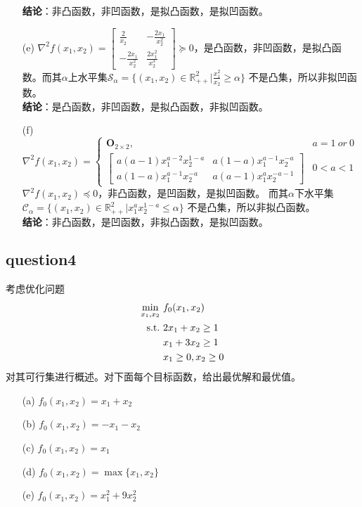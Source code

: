 \documentclass[12pt,a4paper]{ctexart}
\begin{document}
\begin{itemize}
    \textbf{结论}：非凸函数，非凹函数，是拟凸函数，是拟凹函数。
    \item[(e)] $\nabla^2f(x_1,x_2)=
    \begin{bmatrix}
        \frac{2}{x_2} & -\frac{2x_1}{x_2^2} \\
        -\frac{2x_1}{x_2^2} & \frac{2x_1^2}{x_2^3}
    \end{bmatrix} \succeq 0
    $，是凸函数，非凹函数，是拟凸函数。而其$\alpha$上水平集$\mathcal{S}_{\alpha}=\{(x_1,x_2) \in \mathbb{R}^2_{++} | \frac{x_1^2}{x_2}\geq \alpha\}$
    不是凸集，所以非拟凹函数。\\
    \textbf{结论}：是凸函数，非凹函数，是拟凸函数，非拟凹函数。
    \item[(f)]
    $
        \nabla^2f(x_1,x_2)=\left\{
        \begin{array}{ll}
        \boldsymbol{O}_{2 \times 2}, &a=1\ or\ 0\\
        \begin{bmatrix}
            a(a-1)x_1^{a-2}x_2^{1-a} & a(1-a)x_1^{a-1}x_2^{-a} \\
            a(1-a)x_1^{a-1}x_2^{-a} & a(a-1)x_1^{a}x_2^{-a-1}
        \end{bmatrix} & 0<a<1
        \end{array}
        \right.
    $
    $\nabla^2 f(x_1,x_2) \preceq 0$，非凸函数，是凹函数，是拟凹函数。
    而其$\alpha$下水平集$\mathcal{C}_{\alpha}=\{(x_1,x_2) \in \mathbb{R}^2_{++} | x_1^a x_2^{1-a}\leq \alpha\}$
    不是凸集，所以非拟凸函数。\\
    \textbf{结论}：非凸函数，是凹函数，非拟凸函数，是拟凹函数。

\end{itemize}  

\subsection*{question4}
考虑优化问题
\begin{align*}
\min_{x_1,x_2} \ &f_0(x_1,x_2) \\
\rm{s.t.}\  &2x_1+x_2 \geq 1\\
          & x_1+3x_2 \geq 1\\
          &x_1 \geq 0,x_2 \geq 0
\end{align*}
对其可行集进行概述。对下面每个目标函数，给出最优解和最优值。
\begin{itemize}
    \item[(a)] $f_0(x_1,x_2)=x_1+x_2$
    \item[(b)] $f_0(x_1,x_2)=-x_1-x_2$
    \item[(c)] $f_0(x_1,x_2)=x_1$
    \item[(d)] $f_0(x_1,x_2)=\max\{x_1,x_2\}$
    \item[(e)] $f_0(x_1,x_2)=x_1^2+9x_2^2$
\end{itemize}  
\end{document}
